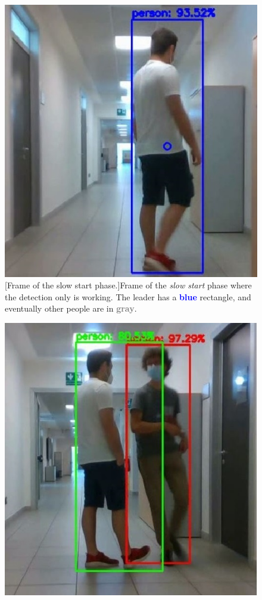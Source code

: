 \begin{figure}[!h]
	\centering
	\begin{minipage}{.49\textwidth}
		\centering
		\includegraphics[width=1\linewidth]{images/solution/slowStart}
		\captionsetup{margin=0.2cm}
		[Frame of the slow start phase.]{Frame of the \textit{slow start} phase where the detection only is working. The leader has a \textbf{\textcolor{blue}{blue}} rectangle, and eventually other people are in \textbf{\textcolor{gray}{gray}}.}
		\label{fig:slowStart}
	\end{minipage}
	\begin{minipage}{.49\textwidth}
		\centering
		\includegraphics[width=1\linewidth]{images/solution/leaderSubjectOk}

\end{minipage}
\end{figure}
